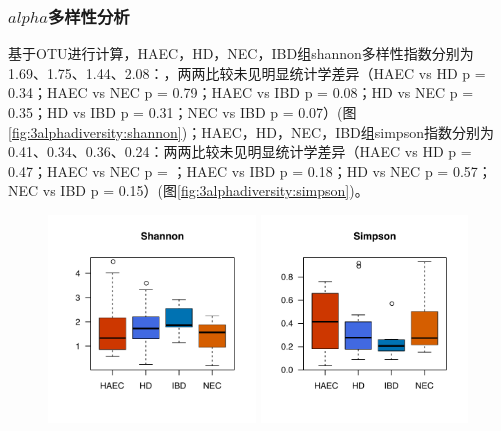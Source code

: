     \subsubsection{$alpha$多样性分析}
    基于OTU进行计算，HAEC，HD，NEC，IBD组shannon多样性指数分别为1.69、1.75、1.44、2.08：，两两比较未见明显统计学差异（HAEC vs HD p = 0.34；HAEC vs NEC p = 0.79；HAEC vs IBD p = 0.08；HD vs NEC p = 0.35；HD vs IBD p = 0.31；NEC vs IBD p = 0.07）(图\ref{fig:3alphadiversity:shannon})；HAEC，HD，NEC，IBD组simpson指数分别为0.41、0.34、0.36、0.24：两两比较未见明显统计学差异（HAEC vs HD p = 0.47；HAEC vs NEC p = ；HAEC vs IBD p = 0.18；HD vs NEC p = 0.57；NEC vs IBD p = 0.15）(图\ref{fig:3alphadiversity:simpson})。
      \begin{figure}[!htp]
        \centering
            {\includegraphics[height=5.5cm]{figure/3shannon.pdf}}
            \hspace{4em}
            {\includegraphics[height=5.5cm]{figure/3simpson.pdf}}
        \label{fig:3alphadiversity}
      \end{figure}

